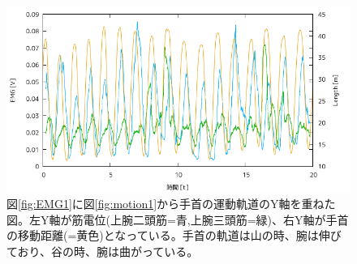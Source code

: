 \documentclass{jsarticle}
\begin{document}
\begin{figure}[htbp]
  \begin{center}
    \includegraphics[clip,width=120mm]{Graph_6.png}
    \caption{図\ref{fig:EMG1}に図\ref{fig:motion1}から手首の運動軌道のY軸を重ねた図。左Y軸が筋電位(上腕二頭筋=青,上腕三頭筋=緑)、右Y軸が手首の移動距離(=黄色)となっている。手首の軌道は山の時、腕は伸びており、谷の時、腕は曲がっている。\label{fig:+length}}
  \end{center}
\end{figure}
\end{document}
